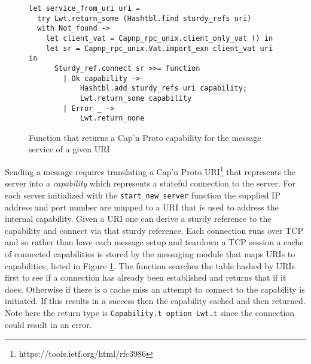 \begin{figure}
  \begin{lstlisting}
let service_from_uri uri =
  try Lwt.return_some (Hashtbl.find sturdy_refs uri)
  with Not_found ->
    let client_vat = Capnp_rpc_unix.client_only_vat () in
    let sr = Capnp_rpc_unix.Vat.import_exn client_vat uri in
      Sturdy_ref.connect sr >>= function
        | Ok capability ->
            Hashtbl.add sturdy_refs uri capability;
            Lwt.return_some capability
        | Error _ -> 
            Lwt.return_none
  \end{lstlisting}
  \centering
  \caption{Function that returns a Cap'n Proto capability for the message service of a given URI}
  \label{fig:service-from-uri}
\end{figure}

Sending a message requires translating a Cap'n Proto URI\footnote{https://tools.ietf.org/html/rfc3986} that represents the server into a \emph{capability} which represents a stateful connection to the server. For each server initialized with the \texttt{start\_new\_server} function the supplied IP address and port number are mapped to a URI that is used to address the internal capability. Given a URI one can derive a sturdy reference to the capability and connect via that sturdy reference. Each connection runs over TCP and so rather than have each message setup and teardown a TCP session a cache of connected capabilities is stored by the messaging module that maps URIs to capabilities, listed in Figure \ref{fig:service-from-uri}. The function searches the table hashed by URIs first to see if a connection has already been established and returns that if it does. Otherwise if there is a cache miss an attempt to connect to the capability is initiated. If this results in a success then the capability cached and then returned. Note here the return type is \texttt{Capability.t option Lwt.t} since the connection could result in an error. \\

